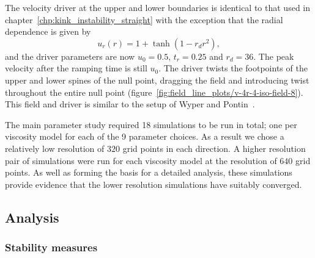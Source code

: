 The velocity driver at the upper and lower boundaries is identical to that used in chapter~\ref{chp:kink_instability_straight} with the exception that the radial dependence is given by
\begin{equation}
  \label{eq:khi_radial_twisting_function}
  u_r(r) = 1 + \tanh(1 - r_d r^2),
\end{equation}
and the driver parameters are now $u_0 = 0.5$, $t_r = 0.25$ and $r_d = 36$. The peak velocity after the ramping time is still $u_0$. The driver twists the footpoints of the upper and lower spines of the null point, dragging the field and introducing twist throughout the entire null point (figure~\ref{fig:field_line_plots/v-4r-4-iso-field-8}). This field and driver is similar to the setup of Wyper and Pontin~\cite{wyperKelvinHelmholtzInstabilityCurrentvortex2013}.

The main parameter study required 18 simulations to be run in total; one per viscosity model for each of the 9 parameter choices. As a result we chose a relatively low resolution of $320$ grid points in each direction. A higher resolution pair of simulations were run for each viscosity model at the resolution of $640$ grid points. As well as forming the basis for a detailed analysis, these simulations provide evidence that the lower resolution simulations have suitably converged. 

\subsection{Analysis}

\subsubsection{Stability measures}

\label{sec:stability_measures}

